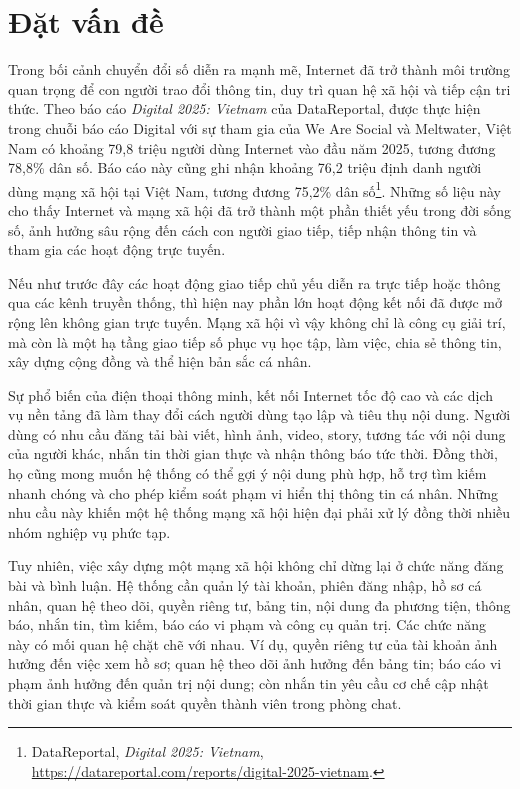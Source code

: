 \documentclass[../DoAn.tex]{subfiles}
\begin{document}
\section{Đặt vấn đề}
\label{section:1.1}
Trong bối cảnh chuyển đổi số diễn ra mạnh mẽ, Internet đã trở thành môi trường quan trọng để con người trao đổi thông tin, duy trì quan hệ xã hội và tiếp cận tri thức. Theo báo cáo \textit{Digital 2025: Vietnam} của DataReportal, được thực hiện trong chuỗi báo cáo Digital với sự tham gia của We Are Social và Meltwater, Việt Nam có khoảng 79,8 triệu người dùng Internet vào đầu năm 2025, tương đương 78,8\% dân số. Báo cáo này cũng ghi nhận khoảng 76,2 triệu định danh người dùng mạng xã hội tại Việt Nam, tương đương 75,2\% dân số\footnote{DataReportal, \textit{Digital 2025: Vietnam}, \url{https://datareportal.com/reports/digital-2025-vietnam}.}. Những số liệu này cho thấy Internet và mạng xã hội đã trở thành một phần thiết yếu trong đời sống số, ảnh hưởng sâu rộng đến cách con người giao tiếp, tiếp nhận thông tin và tham gia các hoạt động trực tuyến.

Nếu như trước đây các hoạt động giao tiếp chủ yếu diễn ra trực tiếp hoặc thông qua các kênh truyền thống, thì hiện nay phần lớn hoạt động kết nối đã được mở rộng lên không gian trực tuyến. Mạng xã hội vì vậy không chỉ là công cụ giải trí, mà còn là một hạ tầng giao tiếp số phục vụ học tập, làm việc, chia sẻ thông tin, xây dựng cộng đồng và thể hiện bản sắc cá nhân.

Sự phổ biến của điện thoại thông minh, kết nối Internet tốc độ cao và các dịch vụ nền tảng đã làm thay đổi cách người dùng tạo lập và tiêu thụ nội dung. Người dùng có nhu cầu đăng tải bài viết, hình ảnh, video, story, tương tác với nội dung của người khác, nhắn tin thời gian thực và nhận thông báo tức thời. Đồng thời, họ cũng mong muốn hệ thống có thể gợi ý nội dung phù hợp, hỗ trợ tìm kiếm nhanh chóng và cho phép kiểm soát phạm vi hiển thị thông tin cá nhân. Những nhu cầu này khiến một hệ thống mạng xã hội hiện đại phải xử lý đồng thời nhiều nhóm nghiệp vụ phức tạp.

Tuy nhiên, việc xây dựng một mạng xã hội không chỉ dừng lại ở chức năng đăng bài và bình luận. Hệ thống cần quản lý tài khoản, phiên đăng nhập, hồ sơ cá nhân, quan hệ theo dõi, quyền riêng tư, bảng tin, nội dung đa phương tiện, thông báo, nhắn tin, tìm kiếm, báo cáo vi phạm và công cụ quản trị. Các chức năng này có mối quan hệ chặt chẽ với nhau. Ví dụ, quyền riêng tư của tài khoản ảnh hưởng đến việc xem hồ sơ; quan hệ theo dõi ảnh hưởng đến bảng tin; báo cáo vi phạm ảnh hưởng đến quản trị nội dung; còn nhắn tin yêu cầu cơ chế cập nhật thời gian thực và kiểm soát quyền thành viên trong phòng chat.
\end{document}
